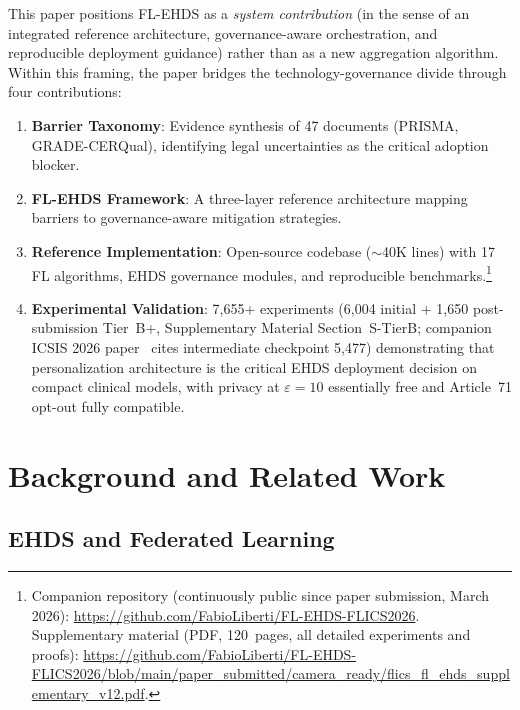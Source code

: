 \documentclass[conference]{IEEEtran}
\begin{document}
This paper positions FL-EHDS as a \emph{system contribution} (in the sense of an integrated reference architecture, governance-aware orchestration, and reproducible deployment guidance) rather than as a new aggregation algorithm. Within this framing, the paper bridges the technology-governance divide through four contributions:
\begin{enumerate}
    \item \textbf{Barrier Taxonomy}: Evidence synthesis of 47 documents (PRISMA, GRADE-CERQual), identifying legal uncertainties as the critical adoption blocker.
    \item \textbf{FL-EHDS Framework}: A three-layer reference architecture mapping barriers to governance-aware mitigation strategies.
    \item \textbf{Reference Implementation}: Open-source codebase ($\sim$40K lines) with 17 FL algorithms, EHDS governance modules, and reproducible benchmarks.\footnote{Companion repository (continuously public since paper submission, March 2026): \url{https://github.com/FabioLiberti/FL-EHDS-FLICS2026}. Supplementary material (PDF, 120~pages, all detailed experiments and proofs): \url{https://github.com/FabioLiberti/FL-EHDS-FLICS2026/blob/main/paper_submitted/camera_ready/flics_fl_ehds_supplementary_v12.pdf}.}
    \item \textbf{Experimental Validation}: 7,655+ experiments (6,004 initial $+$ 1,650 post-submission Tier~B+, Supplementary Material Section~S-TierB; companion ICSIS 2026 paper~\cite{liberti2026icsis} cites intermediate checkpoint 5,477) demonstrating that personalization architecture is the critical EHDS deployment decision on compact clinical models, with privacy at $\varepsilon{=}10$ essentially free and Article~71 opt-out fully compatible.
\end{enumerate}

\section{Background and Related Work}
\label{sec:background}

\subsection{EHDS and Federated Learning}
\end{document}
